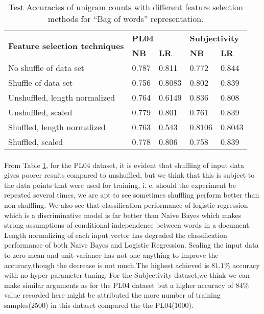 \documentclass[a4paper,26pt]{article}
\begin{document}
\begin{table}[H]
\centering
\begin{tabular}{|l|l|l|l|l|}
\hline
\multirow{2}{*}{\textbf{Feature selection techniques}} & \multicolumn{2}{l|}{\textbf{PL04}} & \multicolumn{2}{l|}{\textbf{Subjectivity}} \\ \cline{2-5} 
                                                       & \textbf{NB}      & \textbf{LR}     & \textbf{NB}          & \textbf{LR}         \\ \hline
No shuffle of data set                                 & 0.787            & 0.811           & 0.772                & 0.844               \\ 
Shuffle of data set                                    & 0.756            & 0.8083          & 0.802                & 0.839               \\ 
Unshuffled, length normalized                          & 0.764            & 0.6149          & 0.836                & 0.808               \\ 
Unshuffled, scaled                                     & 0.779            & 0.801           & 0.761                & 0.839               \\ 
Shuffled, length normalized                            & 0.763            & 0.543           & 0.8106               & 0.8043              \\ 
Shuffled, scaled                                       & 0.778            & 0.806           & 0.758                & 0.839               \\ \hline
\end{tabular}
\caption{Test Accuracies of unigram counts with different feature selection methods for ``Bag of words'' representation.}
\label{tab:unigram test accuracies}
\end{table}

\paragraph{}
From Table \ref{tab:unigram test accuracies}, for the PL04 dataset, it is evident that shuffling of input data gives poorer results compared to unshuffled, but we think that this is subject to the data points that were used for training, i. e. should the experiment be repeated several times, we are apt to see sometimes shuffling perform better than non-shuffling. We also see that classification performance of logistic regression which is a discriminative model is far better than Naive Bayes which makes strong assumptions of conditional independence between words in a document. Length normalizing of each input vector has degraded the classification performance of both Naive Bayes and Logistic Regression. Scaling the input data to zero mean and unit variance has not one anything to improve the accuracy,though the decrease is not much.The highest achieved is $81.1\%$ accuracy with no hyper parameter tuning. For the Subjectivity dataset,we think we can make similar arguments as for the PL04 dataset but a higher accuracy of $84\%$ value recorded here might be attributed the more number of training samples(2500) in this dataset compared the the PL04(1000).
\end{document}

